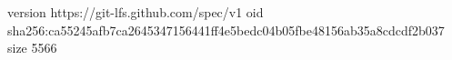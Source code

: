 version https://git-lfs.github.com/spec/v1
oid sha256:ca55245afb7ca2645347156441ff4e5bedc04b05fbe48156ab35a8cdcdf2b037
size 5566
